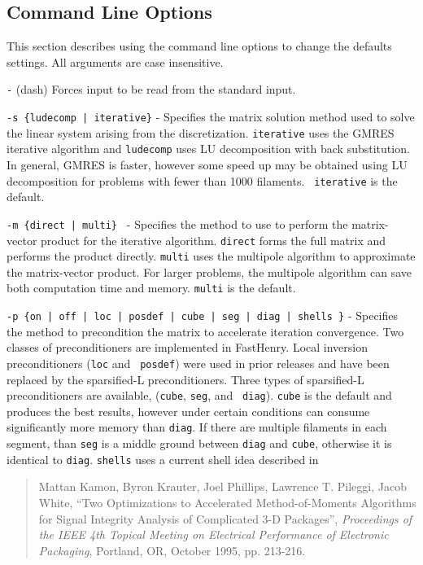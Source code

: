 \subsection{Command Line Options}
\label{clo}

This section describes using the command line options to change the
defaults settings.  All arguments are case insensitive. 

{\tt -} (dash) Forces input to be read from the standard input.  

\vspace{0.2in}
{\tt -s \{ludecomp | iterative\}} - Specifies the matrix solution
method used to solve the linear system arising from the
discretization.  {\tt iterative} uses the GMRES iterative algorithm
and {\tt ludecomp} uses LU decomposition with back substitution.  In
general, GMRES is faster, however some speed up may be obtained using
LU decomposition for problems with fewer than 1000 filaments.  {\tt
iterative} is the default.

\vspace{0.2in}
{\tt -m \{direct | multi\} } - Specifies the method to use to perform
the matrix-vector product for the iterative algorithm.  {\tt direct}
forms the full matrix and performs the product directly.  {\tt multi}
uses the multipole algorithm to approximate the matrix-vector product.
For larger problems, the multipole algorithm can save both computation time and
memory. {\tt multi} is the default.

\vspace{0.2in}
{\tt -p \{on | off | loc | posdef | cube | seg | diag | shells \}} -
Specifies the method to precondition the matrix to accelerate
iteration convergence. Two classes of preconditioners are implemented
in FastHenry.  Local inversion preconditioners ({\tt loc} and {\tt
posdef}) were used in prior releases and have been replaced by the
sparsified-L preconditioners.  Three types of sparsified-L
preconditioners are available, ({\tt cube}, {\tt seg}, and {\tt
diag}).  {\tt cube} is the default and produces the best results,
however under certain conditions can consume significantly more memory
than {\tt diag}.  If there are multiple filaments in each segment,
than {\tt seg} is a middle ground between {\tt diag} and {\tt cube},
otherwise it is identical to {\tt diag}.  {\tt shells} uses a
current shell idea described in

\begin{quote}
\noindent
Mattan Kamon, Byron Krauter, Joel Phillips, Lawrence T. Pileggi, Jacob
White, 
``Two Optimizations to Accelerated
     Method-of-Moments Algorithms for Signal Integrity Analysis of
     Complicated 3-D Packages'', {\em Proceedings of the IEEE 4th
     Topical Meeting on Electrical Performance of Electronic
     Packaging}, Portland, OR, October 1995, pp. 213-216.
\end{quote}

